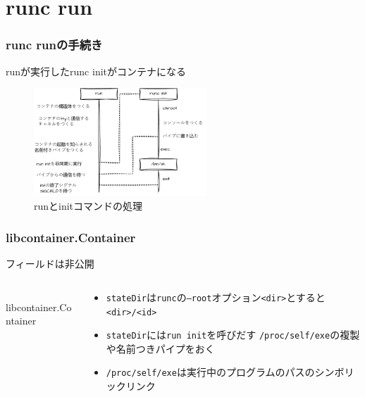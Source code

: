 \documentclass[unicode, 14pt, aspectratio=169]{beamer}
\begin{document}
\section{runc run}
\begin{frame}[t]
  \frametitle{runc runの手続き}
  runが実行したrunc initがコンテナになる
  \begin{figure}
    \centering
    \includegraphics[width=6.5cm]{images/images.drawio.pdf}
    \caption{runとinitコマンドの処理}
    \label{fig:fuga}
  \end{figure}
\end{frame}
\begin{frame}[t]
  \frametitle{libcontainer.Container}
  フィールドは非公開
  \begin{columns}
    \begin{column}{0.5\textwidth}
      \begin{center}
        \inputminted{go}{code/container.go}
        libcontainer.Container\supercite{libcontainer}
      \end{center}
    \end{column}
    \begin{column}{0.5\textwidth}  %
      \begin{itemize}[leftmargin=0.2cm,label=$\circ$]
        \item \texttt{stateDir}は\texttt{runc}の\texttt{--root}オプション\texttt{<dir>}とすると\texttt{<dir>/<id>}
        \item \texttt{stateDir}には\texttt{run init}を呼びだす \texttt{/proc/self/exe}の複製や名前つきパイプをおく
        \item \texttt{/proc/self/exe}は実行中のプログラムのパスのシンボリックリンク
      \end{itemize}
    \end{column}
\end{columns}
  
\end{frame}
\end{document}
